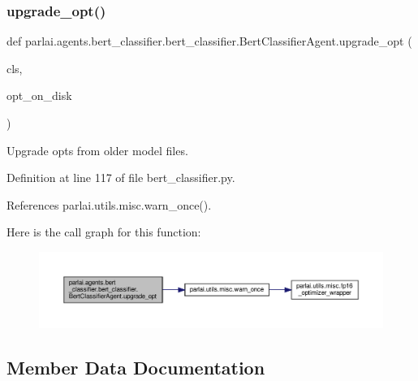 \subsubsection{\texorpdfstring{upgrade\+\_\+opt()}{upgrade\_opt()}}
{\footnotesize\ttfamily def parlai.\+agents.\+bert\+\_\+classifier.\+bert\+\_\+classifier.\+Bert\+Classifier\+Agent.\+upgrade\+\_\+opt (\begin{DoxyParamCaption}\item[{}]{cls,  }\item[{}]{opt\+\_\+on\+\_\+disk }\end{DoxyParamCaption})}

\begin{DoxyVerb}Upgrade opts from older model files.\end{DoxyVerb}
 

Definition at line 117 of file bert\+\_\+classifier.\+py.



References parlai.\+utils.\+misc.\+warn\+\_\+once().

Here is the call graph for this function\+:
\nopagebreak
\begin{figure}[H]
\begin{center}
\leavevmode
\includegraphics[width=350pt]{classparlai_1_1agents_1_1bert__classifier_1_1bert__classifier_1_1BertClassifierAgent_a2eabac94b73fb53be7e7b05ccc788621_cgraph}
\end{center}
\end{figure}


\subsection{Member Data Documentation}
\mbox{\label{classparlai_1_1agents_1_1bert__classifier_1_1bert__classifier_1_1BertClassifierAgent_a23a9fab5a21c9ee44ab416476b7f0361}} 
